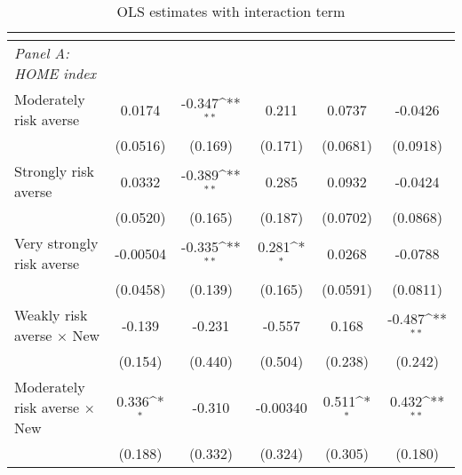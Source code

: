 {
\def\sym#1{\ifmmode^{#1}\else\(^{#1}\)\fi}
\begin{longtable}{l*{5}{c}}
\caption{OLS estimates with interaction term\label{table:5}}\\
\toprule\endfirsthead\midrule\endhead\midrule\endfoot\endlastfoot
                    &&&&&\\
\midrule
\textit{Panel A: HOME index} & & & & & \\
Moderately risk averse&      0.0174         &      -0.347\sym{**} &       0.211         &      0.0737         &     -0.0426         \\
                    &    (0.0516)         &     (0.169)         &     (0.171)         &    (0.0681)         &    (0.0918)         \\

Strongly risk averse&      0.0332         &      -0.389\sym{**} &       0.285         &      0.0932         &     -0.0424         \\
                    &    (0.0520)         &     (0.165)         &     (0.187)         &    (0.0702)         &    (0.0868)         \\

Very strongly risk averse&    -0.00504         &      -0.335\sym{**} &       0.281\sym{*}  &      0.0268         &     -0.0788         \\
                    &    (0.0458)         &     (0.139)         &     (0.165)         &    (0.0591)         &    (0.0811)         \\

Weakly risk averse $\times$ New&      -0.139         &      -0.231         &      -0.557         &       0.168         &      -0.487\sym{**} \\
                    &     (0.154)         &     (0.440)         &     (0.504)         &     (0.238)         &     (0.242)         \\

Moderately risk averse $\times$ New&       0.336\sym{*}  &      -0.310         &    -0.00340         &       0.511\sym{*}  &       0.432\sym{**} \\
                    &     (0.188)         &     (0.332)         &     (0.324)         &     (0.305)         &     (0.180)         \\


\end{longtable}}
